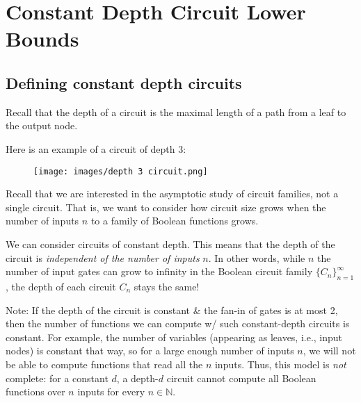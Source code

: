 %
%  
%
%










\chapter{Constant Depth Circuit Lower Bounds}
\label{hastad} %

\section{Defining constant depth circuits}
Recall that the depth of a circuit is the maximal length of a path from a leaf to the output node.

Here is an example of a circuit of depth 3:
\begin{figure}
    \centering
    \texttt{[image: images/depth 3 circuit.png]}
    \label{fig:enter-label}
\end{figure}

Recall that we are interested in the asymptotic study of circuit families, not a single circuit. That is, we want to consider how circuit size grows when the number of inputs $n$ to a family of Boolean functions grows.

We can consider circuits of constant depth. This means that the depth of the circuit is \emph{independent of the number of inputs} $n$. In other words,  while $n$ the number of input gates can grow to infinity in the Boolean circuit family $\{C_n\}_{n=1}^\infty$, the depth of each circuit $C_n$ stays the same!


Note: If the depth of the circuit is constant \& the fan-in of gates is at most 2, then the number of functions we can compute w/ such constant-depth circuits is constant. For example, the number of variables (appearing as leaves, i.e., input nodes) is constant that way, so for a large enough number of inputs $n$, we will not be able to compute functions that read all the $n$ inputs.  
Thus, this model is \emph{not} complete: for a constant $d$, a depth-$d$ circuit cannot compute all Boolean functions over $n$ inputs for every $n \in \mathbb{N}$.

